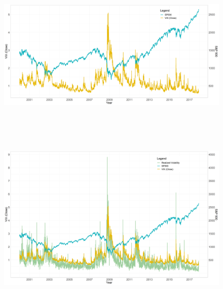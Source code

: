 \begin{figure}[!htbp]\label{fig1}
\includegraphics[width=16cm, height=8cm]{pictures/SPandViX.png}
\end{figure}

\begin{figure}[!htbp]\label{fig2}
\includegraphics[width=16cm, height=8cm]{pictures/SPandVolandViX.png}
\end{figure}


